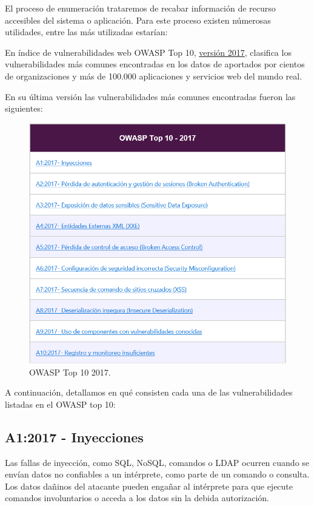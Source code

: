 
El proceso de enumeración trataremos de recabar información de recurso accesibles del sistema 
o aplicación. Para este proceso existen númerosas utilidades, entre las más utilizadas estarían:

En índice de vulnerabilidades web OWASP Top 10, \href{https://wiki.owasp.org/images/5/5e/OWASP-Top-10-2017-es.pdf}{versión 2017}, 
clasifica los vulnerabilidades más comunes encontradas en los datos de aportados por cientos de organizaciones 
y más de 100.000 aplicaciones y servicios web del mundo real.

En su última versión las vulnerabilidades más comunes encontradas fueron las siguientes:

\begin{figure}[!htb] 
    \centering
    \captionsetup{width=1\linewidth} 
    \includegraphics[width=\linewidth]{./imagenes/012_OWASP_Top_10_2017.png}
    \caption{OWASP Top 10 2017.}  
\end{figure}

A continuación, detallamos en qué consisten cada una de las vulnerabilidades listadas en el OWASP top 10:

\subsection{A1:2017 - Inyecciones}

Las fallas de inyección, como SQL, NoSQL, comandos o LDAP ocurren cuando se envían datos no
confiables a un intérprete, como parte de un comando o consulta. Los datos dañinos del atacante
pueden engañar al intérprete para que ejecute comandos involuntarios o acceda a los datos sin
la debida autorización.


